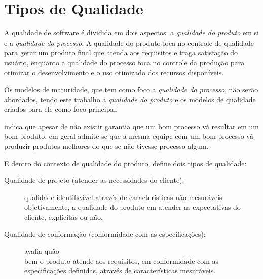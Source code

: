 \documentclass[
	12pt,				%
	openright,			%
	oneside,			%
	a4paper,			%
	english,			%
	brazil,				%
	]{abntex2}
\begin{document}
\section{Tipos de Qualidade}

A qualidade de software é dividida em dois aspectos: a \emph{qualidade do produto} em si e a \emph{qualidade do processo}. A qualidade do produto foca no controle de qualidade para gerar um produto final que atenda aos requisitos e traga satisfação do usuário, enquanto a qualidade do processo foca no controle da produção para otimizar o desenvolvimento e o uso otimizado dos recursos disponíveis.

Os modelos de maturidade, que tem como foco a \emph{qualidade do processo}, não serão abordados, tendo este trabalho a \emph{qualidade do produto} e os modelos de qualidade criados para ele como foco principal.

 indica que apesar de não existir garantia que um bom processo vá resultar em um bom produto, em geral admite-se que a mesma equipe com um bom processo vá produzir produtos melhores do que se não tivesse processo algum.



E dentro do contexto de qualidade do produto,  define dois tipos de qualidade:

\begin{description}
    \item [Qualidade de projeto (atender as necessidades do cliente):] qualidade identificável através de características não mesuráveis objetivamente, a qualidade do produto em atender as expectativas do cliente, explícitas ou não.
    \item [Qualidade de conformação (conformidade com as especificações):] avalia quão \\ bem o produto atende aos requisitos, em conformidade com as especificações definidas, através de características mesuráveis.
\end{description}
\end{document}
